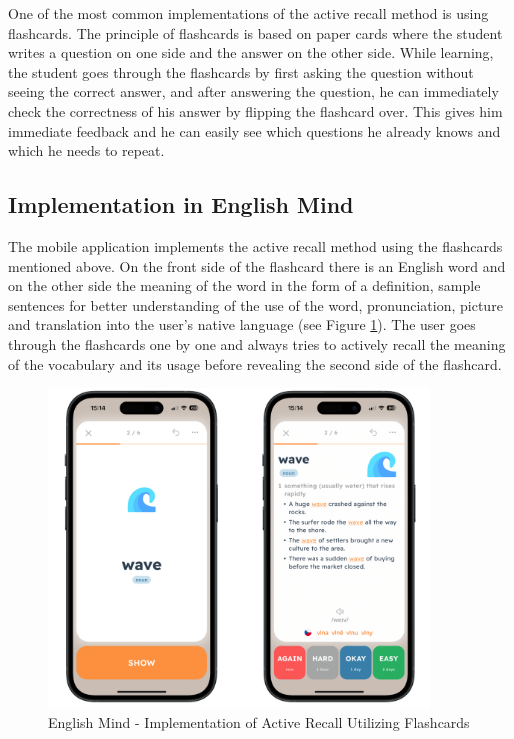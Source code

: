 \newpage

One of the most common implementations of the active recall method is using flashcards. The principle of flashcards is based on paper cards where the student writes a question on one side and the answer on the other side. While learning, the student goes through the flashcards by first asking the question without seeing the correct answer, and after answering the question, he can immediately check the correctness of his answer by flipping the flashcard over. This gives him immediate feedback and he can easily see which questions he already knows and which he needs to repeat.

\subsection*{Implementation in English Mind} 
\label{sec:em-active-recall-flashcards}

The mobile application implements the active recall method using the flashcards mentioned above. On the front side of the flashcard there is an English word and on the other side the meaning of the word in the form of a definition, sample sentences for better understanding of the use of the word, pronunciation, picture and translation into the user's native language (see Figure \ref{fig:em-flashcards}). The user goes through the flashcards one by one and always tries to actively recall the meaning of the vocabulary and its usage before revealing the second side of the flashcard. 

\begin{figure}[!h]
    \includegraphics[width=0.9\textwidth]{src/figures/em-flashcards.png}
    \caption{English Mind - Implementation of Active Recall Utilizing Flashcards}
    \label{fig:em-flashcards}
\end{figure}

